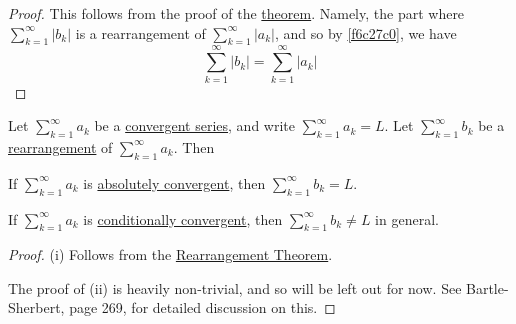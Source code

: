 \begin{proof}
  This follows from the proof of the \href{c171f8a}{theorem}. Namely, the part
  where $\sum_{k=1}^\infty|b_k|$ is a rearrangement of $\sum_{k=1}^\infty|a_k|$,
  and so by \autoref{f6c27c0}, we have
  $$
    \sum_{k=1}^\infty|b_k|=\sum_{k=1}^\infty|a_k|
  $$
\end{proof}

\label{b51a20a}

Let $\sum_{k=1}^\infty a_k$ be a \href{f8901df}{convergent series}, and write
$\sum_{k=1}^\infty a_k=L$. Let $\sum_{k=1}^\infty b_k$ be a
\href{a58ff93}{rearrangement} of $\sum_{k=1}^\infty a_k$. Then
\begin{enumerati}
  \item If $\sum_{k=1}^\infty a_k$ is \href{f823d65}{absolutely convergent},
        then $\sum_{k=1}^\infty b_k=L$.
  \item If $\sum_{k=1}^\infty a_k$ is \href{bc12578}{conditionally convergent},
        then $\sum_{k=1}^\infty b_k\neq L$ in general.
\end{enumerati}

\begin{proof}
  (i) Follows from the \href{c171f8a}{Rearrangement Theorem}.

  The proof of (ii) is heavily non-trivial, and so will be left out for now.
  See Bartle-Sherbert, page 269, for detailed discussion on this.
\end{proof}
